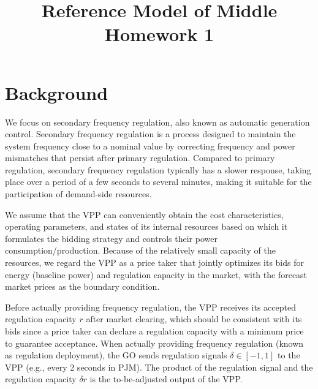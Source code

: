 \documentclass[conference,a4paper]{IEEEtran}
\begin{document}
\title{Reference Model of Middle Homework 1
}


\author{


}

\maketitle

\section{Background}

We focus on secondary frequency regulation, also known as automatic generation control. Secondary frequency regulation is a process designed to maintain the system frequency close to a nominal value by correcting  frequency and power mismatches that persist after primary regulation. Compared to primary regulation, secondary frequency regulation typically has a slower response, taking place over a period of a few seconds to several minutes, making it suitable for the participation of demand-side resources.

We assume that the VPP can conveniently obtain the cost characteristics, operating parameters, and states of its internal resources based on which it formulates the bidding strategy and controls their power consumption/production. Because of the relatively small capacity of the resources, we regard the VPP as a price taker that jointly optimizes its bids for energy (baseline power) and regulation capacity in the market, with the forecast market prices as the boundary condition. 

Before actually providing frequency regulation, the VPP  receives its accepted regulation capacity $r$ after market clearing, which should be consistent with its bids since a price taker can declare a regulation capacity with a minimum price to guarantee acceptance. When actually providing frequency regulation (known as regulation deployment), the GO sends regulation signals $\delta \in [-1, 1]$  to the VPP (e.g., every 2 seconds in PJM). The product of the regulation signal and the regulation capacity $\delta r$ is the to-be-adjusted output of the VPP. 
\end{document}
